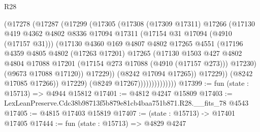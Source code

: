 \begin{lexlean}{R28}
\begin{coremodule}
                              (@17278
                                (@17287
                                  (@17299
                                    (@17305
                                      (@17308
                                        (@17309 @17311)
                                        @17266
                                        (@17130
                                          @419
                                          @4362
                                          @4802
                                          @8336
                                          @17094
                                          @17311
                                          (@17154 @31 @17094 (@4910 (@17157 @31)))
                                          (@17130
                                            @4360
                                            @169
                                            @4807
                                            @4802
                                            @17265
                                            @4551
                                            (@17196
                                              @4359
                                              @4805
                                              @4802
                                              (@17263 @17201)
                                              @17265
                                              (@17130
                                                @1503
                                                @427
                                                @4802
                                                @4804
                                                @17088
                                                @17201
                                                (@17154 @273 @17088 (@4910 (@17157 @273)))
                                                @17230)
                                              (@9673 @17088 @17120))
                                            @17229))
                                        (@8242 @17094 @17265))
                                      @17229))
                                  (@8242 @17085 @17266))
                                @17229)
                              (@8249 @17267))))))))))))))
@17399 := fun (state : @15713) => @4944 @15812
@17401 := @4812 @4247 @15809
@17403 := LexLeanPreserve.Cdc38b98713f5b879e81cb4baa751b871.R28.__fits_78 @4543
@17405 := @4815 @17403 @15819
@17407 := (state : @15713) -> @17401 @17405
@17444 := fun (state : @15713) =>
  @4829
    @4247

\end{coremodule}
\end{lexlean}

